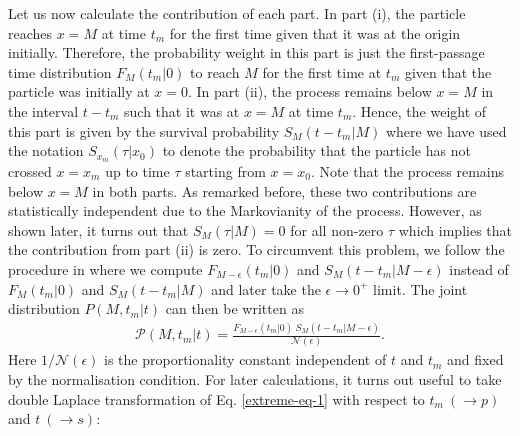 \documentclass[showpacs,amsmath,amssymb,aps,pre,twocolumn,]{revtex4-1}
\def\bluew#1{{\color{black} #1}}
\begin{document}
Let us now calculate the contribution of each part. In part (i), the particle reaches $x=M$ at time $t_m$ for the first time given that it was at the origin initially. Therefore, the probability weight in this part is just the first-passage time distribution $ F_{M}(t_m|0)$ to reach $M$ for the first time at $t_m$ given that the particle was initially at $x=0$. In part (ii), the process remains below $x=M$ in the interval $t-t_m$ such that it was at $x=M$ at time $t_m$. Hence, the weight of this part is given by the survival probability $S_{M}(t-t_m|M)$ where we have used the notation $S_{x_m}(\tau |x_0)$ to denote the probability that the particle has not crossed $x=x_m$ up to time $\tau$ starting from $x=x_0$. Note that the process remains below $x=M$ in both parts. As remarked before, these two contributions are statistically independent due to the Markovianity of the process. However, as shown later, it turns out that $S_{M}(\tau|M)=0$ for all non-zero $\tau$ which implies that the contribution from part (ii) is zero. To circumvent this problem, we follow the procedure in \bluew{\cite{tmax-2, tmax-RAP}} where we compute $F_{M-\epsilon}(t_m|0)$ and $ S_M(t-t_m|M-\epsilon)$ instead of $F_{M}(t_m|0)$ and $ S_M(t-t_m|M)$ and later take the $\epsilon \to 0^+$ limit. The joint distribution $P(M, t_m|t)$ can then be written as
\begin{align}
\mathcal{P}(M, t_m|t)=\frac{ F_{M-\epsilon}(t_m|0) ~S_M(t-t_m|M-\epsilon)}{\mathcal{N} (\epsilon)}.
\label{extreme-eq-1}
\end{align}
Here $1/\mathcal{N} (\epsilon)$ is the proportionality constant independent of $t$ and $t_m$ and fixed by the normalisation condition. For later calculations, it turns out useful to take double Laplace transformation of Eq. \eqref{extreme-eq-1} with respect to $t_m ~(\to p)$ and $t ~(\to s)$: 
\end{document}

